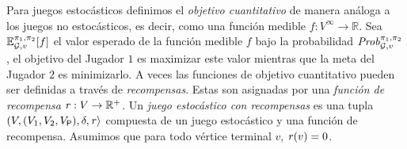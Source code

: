 
Para juegos estocásticos definimos el \emph{objetivo cuantitativo} de manera análoga a los juegos no estocásticos, es decir, como una función medible $f: V^{\infty} \to \mathbb{R}$.   Sea $\mathbb{E}^{\pi_{1}, \pi_{2}}_{\mathcal{G},v}[f]$ el valor esperado de la función medible $f$ bajo la probabilidad $\mathit{Prob}^{\pi_{1}, \pi_{2}}_{\mathcal{G},v}$, el objetivo del Jugador $1$ es maximizar este valor mientras que la meta del Jugador $2$ es minimizarlo.  A veces las funciones de objetivo cuantitativo pueden ser definidas a través de \emph{recompensas}. Estas son asignadas por una \emph{función de recompensa} $\mathit{r}:V \to \mathbb{R}^+$. Un \emph{juego estocástico con recompensas} es una tupla $(V, (V_1, V_2, V_{\mathsf{P}}), \delta, \mathit{r} \rangle$ compuesta de un juego estocástico y una función de recompensa. Asumimos que para todo vértice terminal $v$,  $\mathit{r}(v) = 0$.

